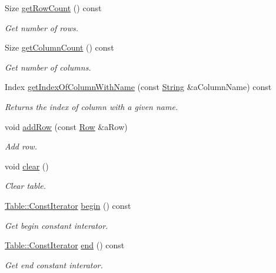 \begin{DoxyCompactItemize}
Size \hyperlink{classostk_1_1core_1_1ctnr_1_1_table_abe8c76eb8d3efed7c548b2112c3ba228}{get\+Row\+Count} () const
\begin{DoxyCompactList}\small\item\em Get number of rows. \end{DoxyCompactList}\item 
Size \hyperlink{classostk_1_1core_1_1ctnr_1_1_table_ae06b81ee41dfc025d414c4bc7e6c7808}{get\+Column\+Count} () const
\begin{DoxyCompactList}\small\item\em Get number of columns. \end{DoxyCompactList}\item 
Index \hyperlink{classostk_1_1core_1_1ctnr_1_1_table_aa778da3685c788f96eeddc7eb870581a}{get\+Index\+Of\+Column\+With\+Name} (const \hyperlink{classostk_1_1core_1_1types_1_1_string}{String} \&a\+Column\+Name) const
\begin{DoxyCompactList}\small\item\em Returns the index of column with a given name. \end{DoxyCompactList}\item 
void \hyperlink{classostk_1_1core_1_1ctnr_1_1_table_a10f2a23e9bdf2e34ab0b938c40cd1d66}{add\+Row} (const \hyperlink{classostk_1_1core_1_1ctnr_1_1table_1_1_row}{Row} \&a\+Row)
\begin{DoxyCompactList}\small\item\em Add row. \end{DoxyCompactList}\item 
void \hyperlink{classostk_1_1core_1_1ctnr_1_1_table_ad373553dd3803cde127ccdafe540456c}{clear} ()
\begin{DoxyCompactList}\small\item\em Clear table. \end{DoxyCompactList}\item 
\hyperlink{classostk_1_1core_1_1ctnr_1_1_table_a44e6a375120737f0675ea6689022050f}{Table\+::\+Const\+Iterator} \hyperlink{classostk_1_1core_1_1ctnr_1_1_table_a0d4c71fa820c4381bd893bde8a0c8e45}{begin} () const
\begin{DoxyCompactList}\small\item\em Get begin constant interator. \end{DoxyCompactList}\item 
\hyperlink{classostk_1_1core_1_1ctnr_1_1_table_a44e6a375120737f0675ea6689022050f}{Table\+::\+Const\+Iterator} \hyperlink{classostk_1_1core_1_1ctnr_1_1_table_a0c7c2095ac2a834b689e16a49b2f001a}{end} () const
\begin{DoxyCompactList}\small\item\em Get end constant interator. \end{DoxyCompactList}\end{DoxyCompactItemize}

